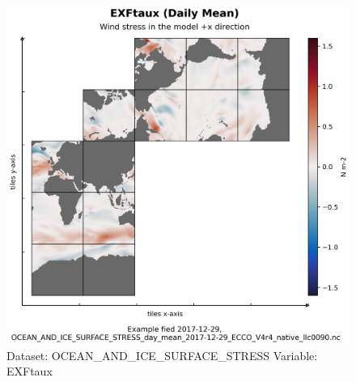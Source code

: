 \begin{figure}[H]
\centering
\includegraphics[scale=0.55]{../images/plots/native_plots/Ocean_and_Sea-Ice_Surface_Stress/EXFtaux.png}
\caption{Dataset: OCEAN\_AND\_ICE\_SURFACE\_STRESS Variable: EXFtaux}
\label{tab:table-OCEAN_AND_ICE_SURFACE_STRESS_EXFtaux-Plot}
\end{figure}
\pagebreak
